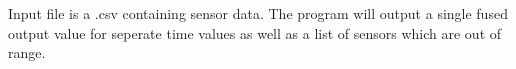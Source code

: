 Input file is a .csv containing sensor data. The program will output a single fused output value for seperate time values as well as a list of sensors which are out of range. 